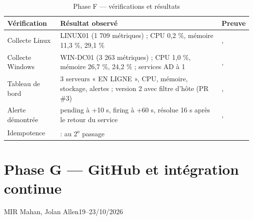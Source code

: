 \begin{table}[H]
\centering
\caption{Phase F — vérifications et résultats}\label{tab:phase-f}
\begin{tabularx}{\linewidth}{@{}P{2.6cm}LP{2.6cm}@{}}
\toprule
\textbf{Vérification} & \textbf{Résultat observé} & \textbf{Preuve} \\
\midrule
Collecte Linux & LINUX01  (1 709 métriques) ; CPU 0,2 \%, mémoire 11,3 \%, \code{/} 29,1 \% & ,  \\
Collecte Windows & WIN-DC01  (3 263 métriques) ; CPU 1,0 \%, mémoire 26,7 \%,  24,2 \% ; services AD à 1 & ,  \\
Tableau de bord & 3 serveurs « EN LIGNE », CPU, mémoire, stockage, alertes ; version 2 avec filtre d'hôte (PR \#3) & ,  \\
Alerte démontrée &  pending à +10 s, firing à +60 s, résolue 16 s après le retour du service & ,  \\
Idempotence &  :  au 2\textsuperscript{e} passage &  \\
\bottomrule
\end{tabularx}
\end{table}



\section{Phase G — GitHub et intégration continue}\label{sec:phase-g}

      {MIR Mahan, Jolan Allen}{19--23/10/2026}{\fait}

